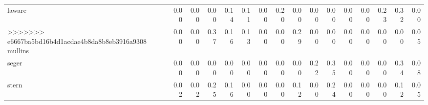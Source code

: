 \begin{tabular}{lrrrrrrrrrrrrrrr}
    laware & 0.00 & 0.00 & 0.00 & 0.14 & 0.11 & 0.00 & 0.20 & 0.00 & 0.00 &  0.00 &  0.00 &  0.00 &  0.23 &  0.32 &  0.00 \\
>>>>>>> e6667ba5bd16b4d1acdae4b8da8b8eb3916a9308
   mullins & 0.00 & 0.00 & 0.37 & 0.16 & 0.13 & 0.00 & 0.00 & 0.29 & 0.00 &  0.00 &  0.00 &  0.00 &  0.00 &  0.00 &  0.05 \\
     seger & 0.00 & 0.00 & 0.00 & 0.00 & 0.00 & 0.00 & 0.00 & 0.00 & 0.22 &  0.35 &  0.00 &  0.00 &  0.00 &  0.34 &  0.08 \\
     stern & 0.02 & 0.02 & 0.25 & 0.16 & 0.00 & 0.00 & 0.00 & 0.12 & 0.00 &  0.24 &  0.00 &  0.00 &  0.00 &  0.12 &  0.05 \\
\bottomrule
\end{tabular}
